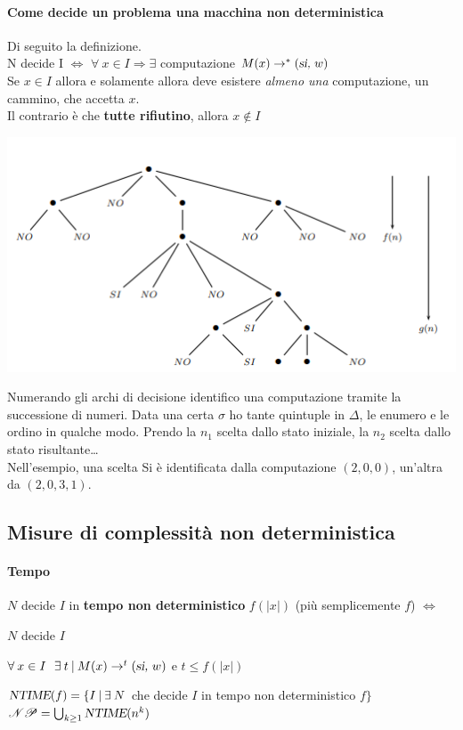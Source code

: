 \documentclass[10pt]{book}
\begin{document}
\paragraph{Come decide un problema una macchina non deterministica} Di seguito la definizione.\\
N decide I $\Leftrightarrow$ $\forall\: x \in I \Rightarrow \exists$ computazione $M(x) \rightarrow^* (\textsl{si, }w)$\\
Se $x \in I$ allora e solamente allora deve esistere \textit{almeno una} computazione, un cammino, che accetta $x$.\\
Il contrario è che \textbf{tutte rifiutino}, allora $x \not\in I$\\
\begin{center}
	\includegraphics[scale=1]{grafo_nondet.png}
\end{center}
Numerando gli archi di decisione identifico una computazione tramite la successione di numeri. Data una certa $\sigma$ ho tante quintuple in $\Delta$, le enumero e le ordino in qualche modo. Prendo la $n_1$ scelta dallo stato iniziale, la $n_2$ scelta dallo stato risultante\ldots\\
Nell'esempio, una scelta Si è identificata dalla computazione $(2, 0, 0)$, un'altra da $(2, 0, 3, 1)$.
\subsection{Misure di complessità non deterministica}
\paragraph{Tempo} $N$ decide $I$ in \textbf{tempo non deterministico} $f(|x|)$ (più semplicemente $f$) $\Leftrightarrow$
\begin{list}{}{}
	\item $N$ decide $I$
	\item $\forall\: x \in I\:\:\:\exists\: t\:|\:M(x)\rightarrow^t(\textsl{si, }w)$ e $t \leq f(|x|)$
\end{list}
$\textsl{NTIME}(f) = \{I \:|\:\exists\:N$ che decide $I$ in tempo non deterministico $f\}$\\
$\mathscr{NP} = \bigcup_{k\geq 1}\textsl{NTIME}(n^k)$
\end{document}
